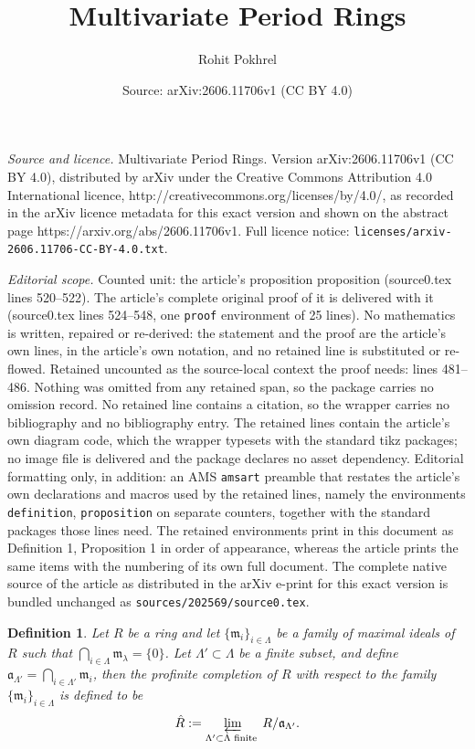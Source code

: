 \documentclass[10pt,a4paper]{amsart}
\title{Multivariate Period Rings}
\author{Rohit Pokhrel}
\date{Source: arXiv:2606.11706v1 (CC BY 4.0)}
\newtheorem{definition}{Definition}
\begin{document}
\maketitle

\noindent\emph{Source and licence.} Multivariate Period Rings. Version arXiv:2606.11706v1 (CC BY 4.0), distributed by arXiv under the Creative Commons Attribution 4.0 International licence, http://creativecommons.org/licenses/by/4.0/, as recorded in the arXiv licence metadata for this exact version and shown on the abstract page https://arxiv.org/abs/2606.11706v1. Full licence notice: \texttt{licenses/arxiv-2606.11706-CC-BY-4.0.txt}.\par\smallskip

\noindent\textit{Editorial scope.} Counted unit: the article's proposition proposition (source0.tex lines 520--522). The article's complete original proof of it is delivered with it (source0.tex lines 524--548, one \texttt{proof} environment of 25 lines). No mathematics is written, repaired or re-derived: the statement and the proof are the article's own lines, in the article's own notation, and no retained line is substituted or re-flowed.  Retained uncounted as the source-local context the proof needs: lines 481--486.  Nothing was omitted from any retained span, so the package carries no omission record.  No retained line contains a citation, so the wrapper carries no bibliography and no bibliography entry.  The retained lines contain the article's own diagram code, which the wrapper typesets with the standard tikz packages; no image file is delivered and the package declares no asset dependency.  Editorial formatting only, in addition: an AMS \texttt{amsart} preamble that restates the article's own declarations and macros used by the retained lines, namely the environments \texttt{definition}, \texttt{proposition} on separate counters, together with the standard packages those lines need.  The retained environments print in this document as Definition 1, Proposition 1 in order of appearance, whereas the article prints the same items with the numbering of its own full document.  The complete native source of the article as distributed in the arXiv e-print for this exact version is bundled unchanged as \texttt{sources/202569/source0.tex}.
\begin{definition}\label{Profinite completion}
    Let $R$ be a ring and let $\{\mathfrak{m}_i\}_{i\in\Lambda}$ be a family of maximal ideals of $R$ such that $\bigcap\limits_{i\in\Lambda}\mathfrak{m}_\lambda=\{0\}$. Let $\Lambda'\subset\Lambda$ be a finite subset, and define $\mathfrak{a}_{\Lambda'}=\bigcap\limits_{i\in\Lambda'}\mathfrak{m}_i$, then the \emph{profinite completion} of $R$ with respect to the family $\{\mathfrak{m}_i\}_{i\in\Lambda}$ is defined to be
    \begin{align*}
        \hat{R}:=\varprojlim\limits_{\Lambda'\subset\Lambda\text{ finite }}R/\mathfrak{a}_{\Lambda'}.
    \end{align*}
\end{definition}
\end{document}
